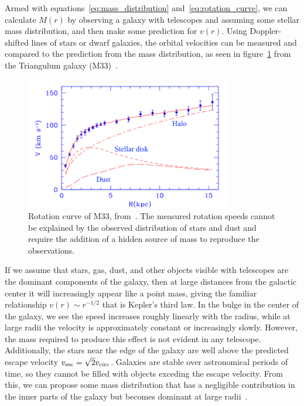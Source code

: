 Armed with equations~\eqref{eq:mass_distribution} and~\eqref{eq:rotation_curve}, we can calculate $M(r)$ by observing a galaxy with telescopes and assuming some stellar mass distribution, and then make some prediction for $v(r)$. Using Doppler-shifted lines of stars or dwarf galaxies, the orbital velocities can be measured and compared to the prediction from the mass distribution, as seen in figure~\ref{fig:rotation_curve} from the Triangulum galaxy (M33)~\cite{Corbelli:1999af}.

\begin{figure}[htb]
\centering
    \includegraphics[width=0.8\textwidth]{figures/dm/m33_rotation}
    \caption{Rotation curve of M33, from~\cite{Corbelli:1999af}. The measured rotation speeds cannot be explained by the observed distribution of stars and dust and require the addition of a hidden source of mass to reproduce the observations.}\label{fig:rotation_curve}
\end{figure}

If we assume that stars, gas, dust, and other objects visible with telescopes are the dominant components of the galaxy, then at large distances from the galactic center it will increasingly appear like a point mass, giving the familiar relationship $v(r) \sim r^{-1/2}$ that is Kepler's third law. In the bulge in the center of the galaxy, we see the speed increases roughly linearly with the radius, while at large radii the velocity is approximately constant or increasingly slowly. However, the mass required to produce this effect is not evident in any telescope. Additionally, the stars near the edge of the galaxy are well above the predicted escape velocity $v_{\mathrm{esc}} = \sqrt{2}v_{\mathrm{circ}}$. Galaxies are stable over astronomical periods of time, so they cannot be filled with objects exceding the escape velocity. From this, we can propose some mass distribution that has a negligible contribution in the inner parts of the galaxy but becomes dominant at large radii~\cite{Navarro:1995iw,Graham:2005xx}.

